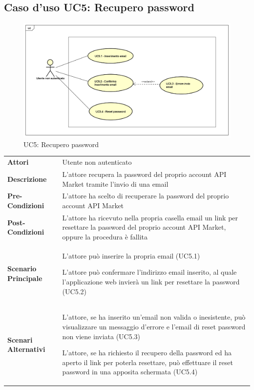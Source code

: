 \newpage
\subsection{Caso d'uso UC5: Recupero password}
\label{UC5}
\begin{figure}[ht]
	\centering
	\includegraphics[scale=0.45]{UML/UC5.png}
	\caption{UC5: Recupero password}
\end{figure}

\begin{longtable}{ l | p{11cm}}
	\hline
	\rowcolor{Gray}
	 \multicolumn{2}{c}{UC5 - Recupero password} \\
	 \hline
	\textbf{Attori} & Utente non autenticato \\
	\textbf{Descrizione} & L'attore recupera la password del proprio account API Market tramite l'invio di una email \\
	\textbf{Pre-Condizioni} & L'attore ha scelto di recuperare la password del proprio account API Market \\
	\textbf{Post-Condizioni} & L'attore ha ricevuto nella propria casella email un link per resettare la password del proprio account API Market, oppure la procedura è fallita \\
	\textbf{Scenario Principale} & 
	\begin{enumerate*}[label=(\arabic*.),itemjoin={\newline}]
		\item L'attore può inserire la propria email (UC5.1)
		\item L'attore può confermare l'indirizzo email inserito, al quale l'applicazione web invierà un link per resettare la password (UC5.2)
	\end{enumerate*}\\
	\textbf{Scenari Alternativi} & 
	\begin{enumerate*}[label=(\arabic*.),itemjoin={\newline}]
		\item L'attore, se ha inserito un'email non valida o inesistente, può visualizzare un messaggio d'errore e l'email di reset password non viene inviata (UC5.3)
		\item L'attore, se ha richiesto il recupero della password ed ha aperto il link per poterla resettare, può effettuare il reset password in una apposita schermata (UC5.4)
	\end{enumerate*}\\
\end{longtable}